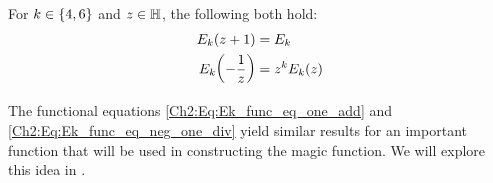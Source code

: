 \begin{boxproposition}\label{Ch2:Prop:Eisenstein_func_eq}
    For $k \in \left\{ 4, 6 \right\}$ and $z \in \mathbb{H}$, the following both hold:
    \begin{align}
        E_k\!\left( z + 1 \right) &= E_k \label{Ch2:Eq:Ek_func_eq_one_add} \\
        E_k\!\left( -\frac{1}{z} \right) &= z^k E_k(z) \label{Ch2:Eq:Ek_func_eq_neg_one_div}
    \end{align}
\end{boxproposition}

The functional equations \eqref{Ch2:Eq:Ek_func_eq_one_add} and \eqref{Ch2:Eq:Ek_func_eq_neg_one_div} yield similar results for an important function that will be used in constructing the magic function. We will explore this idea in .





